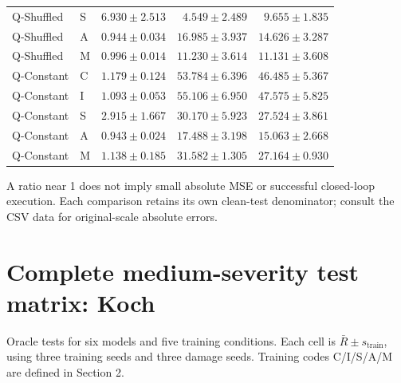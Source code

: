 \documentclass[11pt,a4paper]{article}
\newcommand{\note}[1]{\begin{tcolorbox}[colback=panel,colframe=rule,boxrule=0.5pt,arc=1mm]#1\end{tcolorbox}}
\begin{document}
\begin{center}
\begin{tabular}{llrrr}
Q-Shuffled & S & $6.930\pm2.513$ & $4.549\pm2.489$ & $9.655\pm1.835$ \\
Q-Shuffled & A & $0.944\pm0.034$ & $16.985\pm3.937$ & $14.626\pm3.287$ \\
Q-Shuffled & M & $0.996\pm0.014$ & $11.230\pm3.614$ & $11.131\pm3.608$ \\
Q-Constant & C & $1.179\pm0.124$ & $53.784\pm6.396$ & $46.485\pm5.367$ \\
Q-Constant & I & $1.093\pm0.053$ & $55.106\pm6.950$ & $47.575\pm5.825$ \\
Q-Constant & S & $2.915\pm1.667$ & $30.170\pm5.923$ & $27.524\pm3.861$ \\
Q-Constant & A & $0.943\pm0.024$ & $17.488\pm3.198$ & $15.063\pm2.668$ \\
Q-Constant & M & $1.138\pm0.185$ & $31.582\pm1.305$ & $27.164\pm0.930$ \\
\bottomrule
\end{tabular}
\end{center}
\note{A ratio near 1 does not imply small absolute MSE or successful closed-loop execution. Each comparison retains its own clean-test denominator; consult the CSV data for original-scale absolute errors.}
\clearpage\section{Complete medium-severity test matrix: Koch}
Oracle tests for six models and five training conditions. Each cell is $\bar R\pm s_{\mathrm{train}}$, using three training seeds and three damage seeds. Training codes C/I/S/A/M are defined in Section 2.
\end{document}
